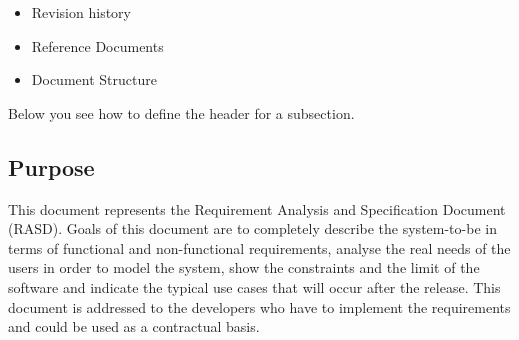 \begin{itemize}
\item
Revision history
\item
Reference Documents 
\item
Document Structure
\end{itemize}
Below you see how to define the header for a subsection.
\subsection{Purpose}
This document represents the Requirement Analysis and Specification Document (RASD). Goals of
this document are to completely describe the system-to-be in terms of functional and non-functional
requirements, analyse the real needs of the users in order to model the system, show the constraints
and the limit of the software and indicate the typical use cases that will occur after the release. This
document is addressed to the developers who have to implement the requirements and could be used as
a contractual basis. 
